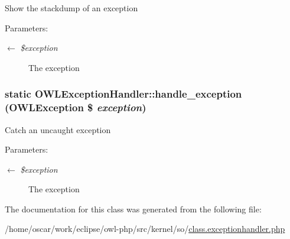 Show the stackdump of an exception \begin{Desc}
\item[Parameters:]
\begin{description}
\item[\mbox{$\leftarrow$} {\em \$exception}]The exception \end{description}
\end{Desc}
\hypertarget{classOWLExceptionHandler_9d10d18ec1d1eb31b5d8ef2a0f288402}{
\subsubsection{\setlength{\rightskip}{0pt plus 5cm}static OWLExceptionHandler::handle\_\-exception ({\bf OWLException} \$ {\em exception})}}
\label{classOWLExceptionHandler_9d10d18ec1d1eb31b5d8ef2a0f288402}


Catch an uncaught exception \begin{Desc}
\item[Parameters:]
\begin{description}
\item[\mbox{$\leftarrow$} {\em \$exception}]The exception \end{description}
\end{Desc}


The documentation for this class was generated from the following file:\begin{CompactItemize}
\item 
/home/oscar/work/eclipse/owl-php/src/kernel/so/\hyperlink{class_8exceptionhandler_8php}{class.exceptionhandler.php}\end{CompactItemize}
